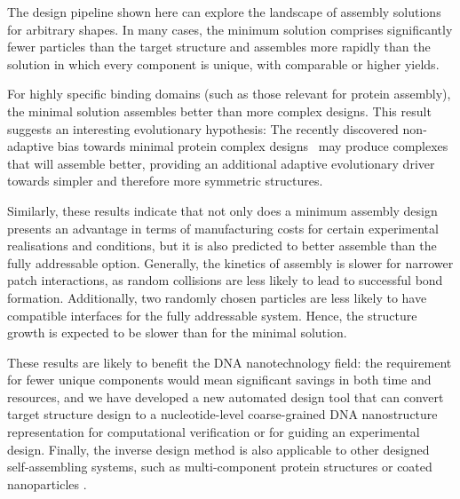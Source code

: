 The design pipeline shown here can explore the landscape of assembly solutions for arbitrary shapes. In many cases, the minimum solution comprises significantly fewer particles than the target structure and assembles more rapidly than the solution in which every component is unique, with comparable or higher yields. 

For highly specific binding domains (such as those relevant for protein assembly), the minimal solution assembles better than more complex designs. This result suggests an interesting evolutionary hypothesis:  The recently discovered non-adaptive bias towards minimal protein complex designs~\cite{johnston2021} may produce complexes that will assemble better, providing an additional adaptive evolutionary driver towards simpler and therefore more symmetric structures.

Similarly, these results indicate that not only does a minimum assembly design presents an advantage in terms of manufacturing costs for certain experimental realisations and conditions, but it is also predicted to better assemble than the fully addressable option. Generally, the kinetics of assembly is slower for narrower patch interactions, as random collisions are less likely to lead to successful bond formation. Additionally, two randomly chosen particles are less likely to have compatible interfaces for the fully addressable system. Hence, the structure growth is expected to be slower than for the minimal solution.

These results are likely to benefit the DNA nanotechnology field: the requirement for fewer unique components would mean significant savings in both time and resources, and we have developed a new automated design tool that can convert target structure design to a nucleotide-level coarse-grained DNA nanostructure representation for computational verification or for guiding an experimental design. Finally, the inverse design method is also applicable to other designed self-assembling systems, such as multi-component protein structures or coated nanoparticles \cite{zhu2021protein,xiong2020three}.